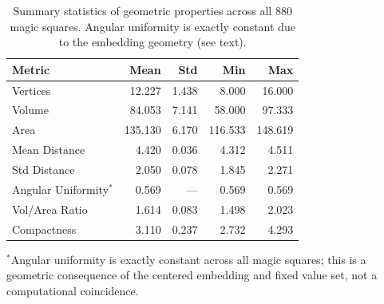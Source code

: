 \begin{table}[H]
\caption{Summary statistics of geometric properties across all 880 magic squares. Angular uniformity is exactly constant due to the embedding geometry (see text).}
\label{tab:geom-stats}
\begin{tabular}{lrrrr}
\toprule
Metric & Mean & Std & Min & Max \\
\midrule
Vertices & 12.227 & 1.438 & 8.000 & 16.000 \\
Volume & 84.053 & 7.141 & 58.000 & 97.333 \\
Area & 135.130 & 6.170 & 116.533 & 148.619 \\
Mean Distance & 4.420 & 0.036 & 4.312 & 4.511 \\
Std Distance & 2.050 & 0.078 & 1.845 & 2.271 \\
Angular Uniformity$^*$ & 0.569 & --- & 0.569 & 0.569 \\
Vol/Area Ratio & 1.614 & 0.083 & 1.498 & 2.023 \\
Compactness & 3.110 & 0.237 & 2.732 & 4.293 \\
\bottomrule
\end{tabular}

\smallskip
\noindent\footnotesize{$^*$Angular uniformity is exactly constant across all magic squares; this is a geometric consequence of the centered embedding and fixed value set, not a computational coincidence.}
\end{table}
